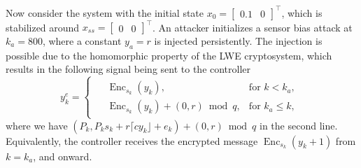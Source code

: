 \documentclass[journal, twoside, web]{ieeecolorpreprint}
\DeclareMathOperator{\enc}{Enc}
\begin{document}

Now consider the system with the initial state $x_0= \begin{bmatrix}
    0.1 & 0
\end{bmatrix}^\top$, which is stabilized around $x_{ss}= \begin{bmatrix}
    0 & 0
\end{bmatrix}^\top$. An attacker initializes a sensor bias attack at $k_{a}=800$, where a constant $y_a=r$ is injected persistently. The injection is possible due to the homomorphic property of the LWE cryptosystem, which results in the following signal being sent to the controller
\begin{equation*}
    y_k^e = \begin{cases} \begin{aligned}  &  \enc_{s_k}(y_k),  &\text{for } k < k_{a}, \\ &  \enc_{s_k}(y_k) + (0, r) \bmod q,  &\text{for } k_{a} \leq k,
    \end{aligned} \end{cases} 
\end{equation*}
where we have $(P_k, P_ks_k + r\lceil c y_k \rfloor + e_k ) + (0, r) \bmod q$ in the second line. Equivalently, the controller receives the encrypted message $\enc_{s_k}(y_k+1)$ from $k=k_{a}$, and onward. 
\end{document}
